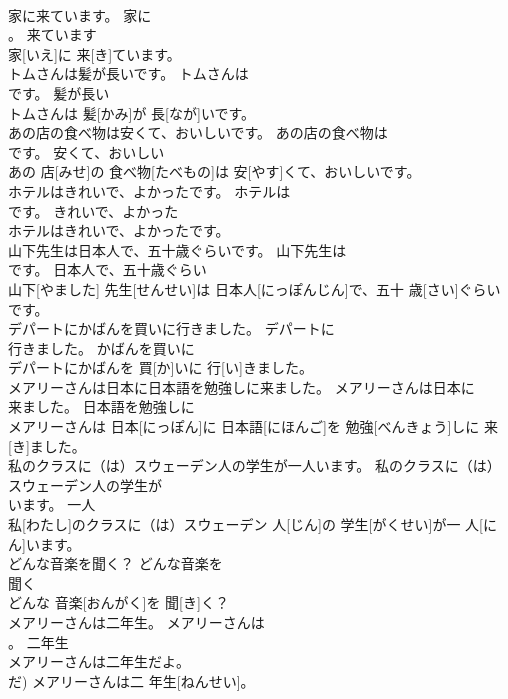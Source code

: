 \documentclass[8pt]{extreport}
\begin{document}
\begin{CJK}{UTF8}{min}
\\	家に来ています。	家に
\\	。	来ています	
\\	家[いえ]に 来[き]ています。	
\\	トムさんは髪が長いです。	トムさんは
\\	です。	髪が長い	
\\	トムさんは 髪[かみ]が 長[なが]いです。	
\\	あの店の食べ物は安くて、おいしいです。	あの店の食べ物は
\\	です。	安くて、おいしい	
\\	あの 店[みせ]の 食べ物[たべもの]は 安[やす]くて、おいしいです。	
\\	ホテルはきれいで、よかったです。	ホテルは
\\	です。	きれいで、よかった	
\\	ホテルはきれいで、よかったです。	
\\	山下先生は日本人で、五十歳ぐらいです。	山下先生は
\\	です。	日本人で、五十歳ぐらい	
\\	山下[やました] 先生[せんせい]は 日本人[にっぽんじん]で、五十 歳[さい]ぐらいです。	
\\	デパートにかばんを買いに行きました。	デパートに
\\	行きました。	かばんを買いに	
\\	デパートにかばんを 買[か]いに 行[い]きました。	
\\	メアリーさんは日本に日本語を勉強しに来ました。	メアリーさんは日本に
\\	来ました。	日本語を勉強しに	
\\	メアリーさんは 日本[にっぽん]に 日本語[にほんご]を 勉強[べんきょう]しに 来[き]ました。	
\\	私のクラスに（は）スウェーデン人の学生が一人います。	私のクラスに（は）スウェーデン人の学生が
\\	います。	一人	
\\	私[わたし]のクラスに（は）スウェーデン 人[じん]の 学生[がくせい]が一 人[にん]います。	
\\	どんな音楽を聞く？	どんな音楽を
\\	聞く	
\\	どんな 音楽[おんがく]を 聞[き]く？	
\\	メアリーさんは二年生。	メアリーさんは
\\	。	二年生	
\\	メアリーさんは二年生だよ。
\\	だ)	メアリーさんは二 年生[ねんせい]。	

\end{CJK}
\end{document}
